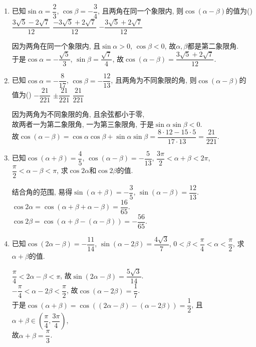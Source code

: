 \begin{enumerate}
\item 已知$\sin\alpha=\dfrac{2}{3}$, $\cos\beta=-\dfrac{3}{4}$, 且两角在同一个象限内, 则$\cos(\alpha-\beta)$的值为\dotfill()
{$\dfrac{3\sqrt5-2\sqrt7}{12}$}
{$\dfrac{-3\sqrt5+2\sqrt7}{12}$}
{$-\dfrac{3\sqrt5+2\sqrt7}{12}$}
\begin{jieda}
因为两角在同一个象限内, 且$\sin\alpha>0$, $\cos\beta<0$, 故$\alpha,\beta$都是第二象限角. \\
于是$\cos\alpha=-\dfrac{\sqrt{5}}{3}$, $\sin\beta=\dfrac{\sqrt{7}}{4}$, 故$\cos(\alpha-\beta)=\dfrac{3\sqrt{5}+2\sqrt{7}}{12}$. 
\end{jieda}


\item 已知$\cos\alpha=-\dfrac{8}{17}$, $\cos\beta=-\dfrac{12}{13}$, 且两角为不同象限的角, 则$\cos(\alpha-\beta)$的值为\dotfill()
{$-\dfrac{21}{221}$}
{$\pm\dfrac{21}{221}$}
{$\dfrac{21}{221}$}
\begin{jieda}
因为两角为不同象限的角, 且余弦都小于零, \\
故两者一为第二象限角, 一为第三象限角, 于是$\sin\alpha\sin\beta<0$. \\
故$\cos(\alpha-\beta)=\cos\alpha\cos\beta+\sin\alpha\sin\beta=\dfrac{8\cdot12-15\cdot5}{17\cdot13}=\dfrac{21}{221}$. 
\end{jieda}


\item 已知$\cos(\alpha+\beta)=\dfrac{4}{5}$, $\cos(\alpha-\beta)=-\dfrac{5}{13}$, 
$\dfrac{3\pi}{2}<\alpha+\beta<2\pi$, $\dfrac{\pi}{2}<\alpha-\beta<\pi$, 求$\cos2\alpha$和$\cos2\beta$的值. 
\begin{jieda}
结合角的范围, 易得$\sin(\alpha+\beta)=-\dfrac{3}{5}$, $\sin(\alpha-\beta)=\dfrac{12}{13}$. \\
$\cos2\alpha=\cos(\alpha+\beta+\alpha-\beta)=\dfrac{16}{65}$. \\
$\cos2\beta=\cos(\alpha+\beta-(\alpha-\beta))=-\dfrac{56}{65}$. 
\end{jieda}


\item 已知$\cos(2\alpha-\beta)=-\dfrac{11}{14}$, $\sin(\alpha-2\beta)=\dfrac{4\sqrt{3}}{7}$, 
$0<\beta<\dfrac{\pi}{4}<\alpha<\dfrac{\pi}{2}$, 求$\alpha+\beta$的值. 
\begin{jieda}
$\dfrac{\pi}{4}<2\alpha-\beta<\pi$, 故$\sin(2\alpha-\beta)=\dfrac{5\sqrt{3}}{14}$. \\
$-\dfrac{\pi}{4}<\alpha-2\beta<\dfrac{\pi}{2}$, 故$\cos(\alpha-2\beta)=\dfrac{1}{7}$. \\
于是$\cos(\alpha+\beta)=\cos((2\alpha-\beta)-(\alpha-2\beta))=\dfrac{1}{2}$, 且$\alpha+\beta\in\left(\dfrac{\pi}{4},\dfrac{3\pi}{4}\right)$, \\
故$\alpha+\beta=\dfrac{\pi}{3}$. 
\end{jieda}



\end{enumerate}
